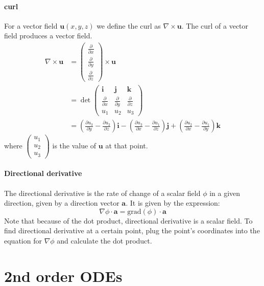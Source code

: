 \documentclass{scrartcl}
\renewcommand{\vec}[1]{\mathbf{#1}}
\begin{document}
\paragraph{curl}
For a vector field $ \vec{u}(x, y, z) $ we define the curl as $ \nabla \times \vec{u} $. The curl of a vector field produces a vector field.
\begin{align}
\nabla \times \vec{u} & = 
\begin{pmatrix}
\frac{\partial}{\partial x} \\[6pt]
\frac{\partial}{\partial y} \\[6pt]
\frac{\partial}{\partial z}
\end{pmatrix} \times \vec{u} \\[6pt]
& = \det \begin{pmatrix}
\vec{i} & \vec{j} & \vec{k} \\
\frac{\partial}{\partial x} & \frac{\partial}{\partial y} & \frac{\partial}{\partial z} \\
u_{1} & u_{2} & u_{3}
\end{pmatrix} \\[6pt]
& = (\frac{\partial u_{3}}{\partial y} - \frac{\partial u_{2}}{\partial z})\vec{i} - (\frac{\partial u_{3}}{\partial x} - \frac{\partial u_{1}}{\partial z})\vec{j} + (\frac{\partial u_{2}}{\partial x} - \frac{\partial u_{1}}{\partial y})\vec{k}
\end{align}
where $ \begin{pmatrix}
u_{1} \\ u_{2} \\ u_{3}
\end{pmatrix} $ is the value of $ \vec{u} $ at that point.

\paragraph{Directional derivative}
The directional derivative is the rate of change of a scalar field $ \phi $ in a given direction, given by a direction vector $ \vec{a} $. It is given by the expression:
\begin{equation}
\nabla \phi \cdot \vec{a} = \textrm{grad} (\phi) \cdot \vec{a}
\end{equation}
Note that because of the dot product, directional derivative is a scalar field. To find directional derivative at a certain point, plug the point's coordinates into the equation for $ \nabla \phi $ and calculate the dot product.

\section{2nd order ODEs}
\end{document}
